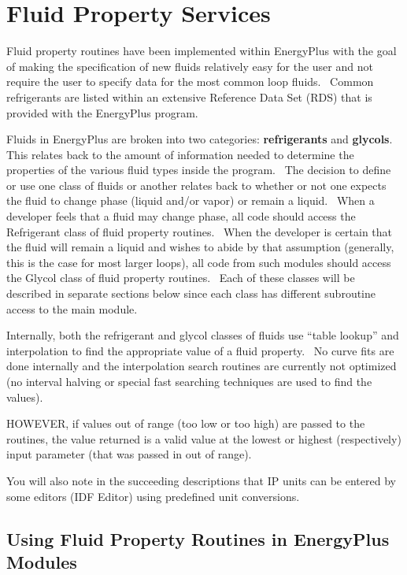 \section{Fluid Property Services}\label{fluid-property-services}

Fluid property routines have been implemented within EnergyPlus with the goal of making the specification of new fluids relatively easy for the user and not require the user to specify data for the most common loop fluids.~ Common refrigerants are listed within an extensive Reference Data Set (RDS) that is provided with the EnergyPlus program.

Fluids in EnergyPlus are broken into two categories: \textbf{refrigerants} and \textbf{glycols}.~ This relates back to the amount of information needed to determine the properties of the various fluid types inside the program.~ The decision to define or use one class of fluids or another relates back to whether or not one expects the fluid to change phase (liquid and/or vapor) or remain a liquid.~ When a developer feels that a fluid may change phase, all code should access the Refrigerant class of fluid property routines.~ When the developer is certain that the fluid will remain a liquid and wishes to abide by that assumption (generally, this is the case for most larger loops), all code from such modules should access the Glycol class of fluid property routines.~ Each of these classes will be described in separate sections below since each class has different subroutine access to the main module.

Internally, both the refrigerant and glycol classes of fluids use ``table lookup'' and interpolation to find the appropriate value of a fluid property.~ No curve fits are done internally and the interpolation search routines are currently not optimized (no interval halving or special fast searching techniques are used to find the values).

HOWEVER, if values out of range (too low or too high) are passed to the routines, the value returned is a valid value at the lowest or highest (respectively) input parameter (that was passed in out of range).

You will also note in the succeeding descriptions that IP units can be entered by some editors (IDF Editor) using predefined unit conversions.

\subsection{Using Fluid Property Routines in EnergyPlus Modules}\label{using-fluid-property-routines-in-energyplus-modules}

